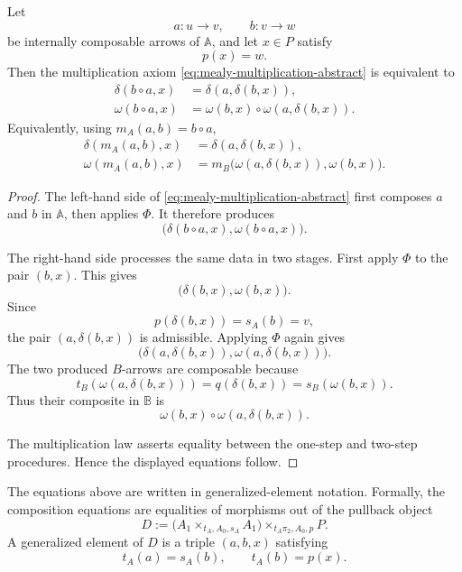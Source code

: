 \begin{proposition}
\label{prop:mealy-multiplication-law}
Let
\[
a:u\to v,
\qquad
b:v\to w
\]
be internally composable arrows of \(\mathbb A\), and let \(x\in P\) satisfy
\[
p(x)=w.
\]
Then the multiplication axiom \eqref{eq:mealy-multiplication-abstract} is equivalent to
\begin{align}
\delta(b\circ a,x)
&=
\delta(a,\delta(b,x)),
\label{eq:delta-composition}
\\
\omega(b\circ a,x)
&=
\omega(b,x)\circ \omega(a,\delta(b,x)).
\label{eq:omega-composition}
\end{align}
Equivalently, using \(m_A(a,b)=b\circ a\),
\begin{align}
\delta(m_A(a,b),x)
&=
\delta(a,\delta(b,x)),
\label{eq:delta-composition-m}
\\
\omega(m_A(a,b),x)
&=
m_B\bigl(\omega(a,\delta(b,x)),\omega(b,x)\bigr).
\label{eq:omega-composition-m}
\end{align}
\end{proposition}

\begin{proof}
The left-hand side of \eqref{eq:mealy-multiplication-abstract} first composes \(a\) and \(b\) in \(\mathbb A\), then applies \(\Phi\). It therefore produces
\[
\bigl(\delta(b\circ a,x),\omega(b\circ a,x)\bigr).
\]

The right-hand side processes the same data in two stages. First apply \(\Phi\) to the pair \((b,x)\). This gives
\[
\bigl(\delta(b,x),\omega(b,x)\bigr).
\]
Since
\[
p(\delta(b,x))=s_A(b)=v,
\]
the pair \((a,\delta(b,x))\) is admissible. Applying \(\Phi\) again gives
\[
\bigl(\delta(a,\delta(b,x)),\omega(a,\delta(b,x))\bigr).
\]
The two produced \(B\)-arrows are composable because
\[
t_B(\omega(a,\delta(b,x)))=q(\delta(b,x))
=
s_B(\omega(b,x)).
\]
Thus their composite in \(\mathbb B\) is
\[
\omega(b,x)\circ \omega(a,\delta(b,x)).
\]

The multiplication law asserts equality between the one-step and two-step procedures. Hence the displayed equations follow.
\end{proof}

\begin{remark}
\label{rem:generalized-elements}
The equations above are written in generalized-element notation. Formally, the composition equations are equalities of morphisms out of the pullback object
\[
D
:=
\bigl(A_1\times_{t_A,A_0,s_A}A_1\bigr)
\times_{t_A\pi_2,A_0,p}
P.
\]
A generalized element of \(D\) is a triple \((a,b,x)\) satisfying
\[
t_A(a)=s_A(b),
\qquad
t_A(b)=p(x).
\]
\end{remark}

